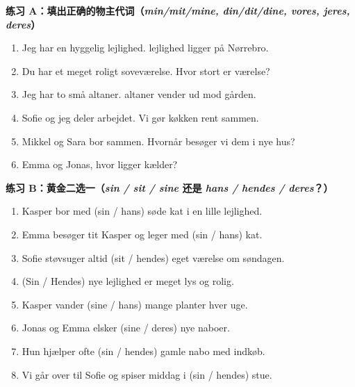 \textbf{练习 A：填出正确的物主代词（\textit{min/mit/mine, din/dit/dine, vores, jeres, deres}）}
\begin{enumerate}
  \item Jeg har en hyggelig lejlighed. \underline{\hspace{1.8cm}} lejlighed ligger på Nørrebro.
  \item Du har et meget roligt soveværelse. Hvor stort er \underline{\hspace{1.8cm}} værelse?
  \item Jeg har to små altaner. \underline{\hspace{1.8cm}} altaner vender ud mod gården.
  \item Sofie og jeg deler arbejdet. Vi gør \underline{\hspace{1.8cm}} køkken rent sammen.
  \item Mikkel og Sara bor sammen. Hvornår besøger vi dem i \underline{\hspace{1.8cm}} nye hus?
  \item Emma og Jonas, hvor ligger \underline{\hspace{1.8cm}} kælder?
\end{enumerate}

\textbf{练习 B：黄金二选一（\textit{sin / sit / sine} 还是 \textit{hans / hendes / deres}？）}
\begin{enumerate}
  \item Kasper bor med \underline{\hspace{2.0cm}} (sin / hans) søde kat i en lille lejlighed.
  \item Emma besøger tit Kasper og leger med \underline{\hspace{2.0cm}} (sin / hans) kat.
  \item Sofie støvsuger altid \underline{\hspace{2.0cm}} (sit / hendes) eget værelse om søndagen.
  \item \underline{\hspace{2.0cm}} (Sin / Hendes) nye lejlighed er meget lys og rolig.
  \item Kasper vander \underline{\hspace{2.0cm}} (sine / hans) mange planter hver uge.
  \item Jonas og Emma elsker \underline{\hspace{2.0cm}} (sine / deres) nye naboer.
  \item Hun hjælper ofte \underline{\hspace{2.0cm}} (sin / hendes) gamle nabo med indkøb.
  \item Vi går over til Sofie og spiser middag i \underline{\hspace{2.0cm}} (sin / hendes) stue.
\end{enumerate}

